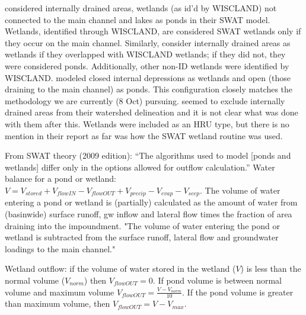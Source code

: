 	\citet{almendinger_willowriverswat_2007} considered internally drained areas, wetlands (as id'd by WISCLAND) not connected to the main channel and lakes as ponds in their SWAT model. Wetlands, identified through WISCLAND, are considered SWAT wetlands only if they occur on the main channel. Similarly, \citet{kirsch_rock_2002} consider internally drained areas as wetlands if they overlapped with WISCLAND wetlands; if they did not, they were considered ponds. Additionally, other non-ID wetlands were identified by WISCLAND. \citet{almendinger_contructingsunrise_2010} modeled closed internal depressions as wetlands and open (those draining to the main channel) as ponds. This configuration closely matches the methodology we are currently (8 Oct) pursuing. \citet{freihoefer_mead_2007} seemed to exclude internally drained areas from their watershed delineation and it is not clear what was done with them after this. Wetlands were included as an HRU type, but there is no mention in their report as far was how the SWAT wetland routine was used.
	
	From SWAT theory (2009 edition): ``The algorithms used to model [ponds and wetlands] differ only in the options allowed for outflow calculation.'' Water balance for a pond or wetland: $V = V_{stored} + V_{flowIN} - V_{flowOUT} +V_{precip}-V_{evap}-V_{seep}$. The volume of water entering a pond or wetland is (partially) calculated as the amount of water from (basinwide) surface runoff, gw inflow and lateral flow times the fraction of area draining into the impoundment. "The volume of water entering the pond or wetland is subtracted from the surface runoff, lateral flow and groundwater loadings to the main channel." 

	Wetland outflow: if the volume of water stored in the wetland ($V$) is less than the normal volume ($V_{norm}$) then $V_{flowOUT}=0$. If pond volume is between normal volume and maximum volume $V_{flowOUT}=\frac{V-V_{norm}}{10}$. If the pond volume is greater than maximum volume, then $V_{flowOUT}=V-V_{max}$. 